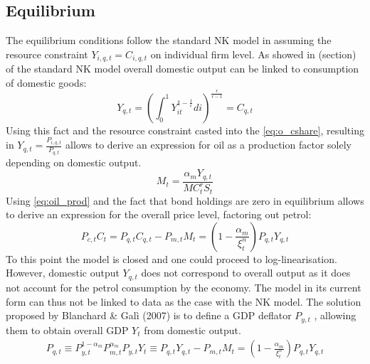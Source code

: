 \documentclass[12pt,a4paper,english]{article} %
\begin{document}
	\subsection{Equilibrium}
	The equilibrium conditions follow the standard NK model in assuming the resource constraint $Y_{i,q,t} = C_{i,q,t}$ on individual firm level. As showed in (section) of the standard NK model overall domestic output can be linked to consumption of domestic goods: 
	\begin{equation}
		Y_{q,t} = \left( \int_{0}^{1} Y_{it}^{1-\frac{1}{\epsilon}} di \right)^{\frac{\epsilon}{\epsilon - 1}} = C_{q,t}
	\end{equation}
	Using this fact and the resource constraint casted into the \eqref{eq:o_cshare}, resulting in $Y_{q,t} = \frac{P_{i,q,t}}{P_{q,t}}$ allows to derive an expression for oil as a production factor solely depending on domestic output.
	\begin{equation} \label{eq:oil_prod}
		M_t = \frac{\alpha_m Y_{q,t}}{MC_{t}^r S_t}
	\end{equation}
	Using \eqref{eq:oil_prod} and the fact that bond holdings are zero in equilibrium allows to derive an expression for the overall price level, factoring out petrol:
	\begin{equation}
		P_{c,t}C_t = P_{q,t} C_{q,t} - P_{m,t}M_t = \left(1 - \frac{\alpha_m}{\xi_t^n} \right) P_{q,t} Y_{q,t}
	\end{equation}
	To this point the model is closed and one could proceed to log-linearisation. However, domestic output $Y_{q,t}$ does not correspond to overall output as it does not account for the petrol consumption by the economy. The model in its current form can thus not be linked to data as the case with the NK model. The solution proposed by Blanchard \& Galì (2007)  is to define a GDP deflator $P_{y,t}$ \cite{blanchard_macroeconomic_2007}, allowing them to obtain overall GDP $Y_t$ from domestic output.
	\begin{equation}
		\begin{aligned}
		P_{q,t} \equiv P_{y,t}^{1-\alpha_m} P_{m,t}^{\alpha_m}
		P_{y,t} Y_t \equiv P_{q,t} Y_{q,t} - P_{m,t} M_t = \left( 1 - \frac{\alpha_m}{\xi_t^n} \right) P_{q,t} Y_{q,t}
		\end{aligned}
	\end{equation}
		
\end{document}
